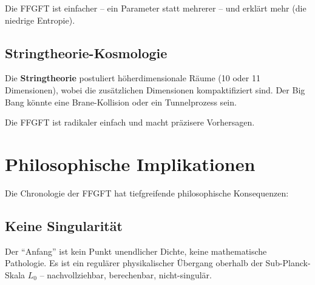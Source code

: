 	Die FFGFT ist einfacher -- ein Parameter statt mehrerer -- und erklärt mehr (die niedrige Entropie).
	
	\subsection{Stringtheorie-Kosmologie}
	
	Die \textbf{Stringtheorie} postuliert höherdimensionale Räume (10 oder 11 Dimensionen), wobei die zusätzlichen Dimensionen kompaktifiziert sind. Der Big Bang könnte eine Brane-Kollision oder ein Tunnelprozess sein.
	
	\begin{center}
		\small
	\end{center}
	
	Die FFGFT ist radikaler einfach und macht präzisere Vorhersagen.
	
	\section{Philosophische Implikationen}
	
	Die Chronologie der FFGFT hat tiefgreifende philosophische Konsequenzen:
	
	\subsection{Keine Singularität}
	
	Der \enquote{Anfang} ist kein Punkt unendlicher Dichte, keine mathematische Pathologie. Es ist ein regulärer physikalischer Übergang oberhalb der Sub-Planck-Skala $L_0$ -- nachvollziehbar, berechenbar, nicht-singulär.
	
